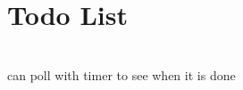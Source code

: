 \chapter{Todo List }
\hypertarget{todo}{}\label{todo}

\begin{DoxyRefList}
\item[{\parbox[t]{\linewidth}{Global \doxylink{camera__busy__state_8c_a6797068b9d698f18f8c3e6f40c179c2d}{Camera\+\_\+\+Busy\+\_\+\+State} (Camera\+\_\+\+Context\+\_\+t \texorpdfstring{$\ast$}{*}context, \doxylink{unionEvent__t}{Event\+\_\+t} \texorpdfstring{$\ast$}{*}event)}}]\hfill \\
\label{todo__todo000001}%
%
can poll with timer to see when it is done 
\end{DoxyRefList}